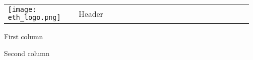 \documentclass[portrait,a0,final]{a0poster}
\begin{document}
\begingroup\setlength{\fboxsep}{0pt}
\colorbox{DonJuan}{
    \begin{tabular}{L{0.29\linewidth} L{0.69\linewidth}}
      \texttt{[image: eth\_logo.png]} & {\color{grey0} Header} \\[10ex]
    \end{tabular}
}\endgroup

\begin{minipage}{0.49\linewidth}
First column
\end{minipage}
\begin{minipage}{0.49\linewidth}
Second column
\end{minipage}
\end{document}
